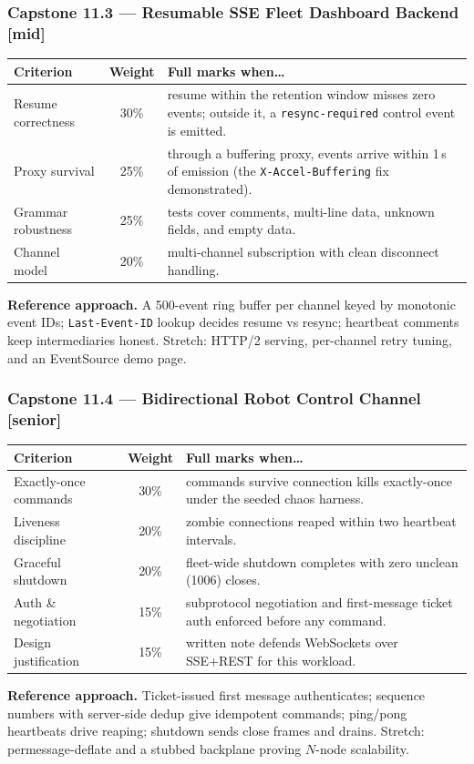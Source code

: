 \subsubsection*{Capstone 11.3 --- Resumable SSE Fleet Dashboard Backend [mid]}
\begin{center}\small
\begin{tabularx}{\textwidth}{l c X}
\toprule
\textbf{Criterion} & \textbf{Weight} & \textbf{Full marks when\ldots} \\
\midrule
Resume correctness & 30\% & resume within the retention window misses zero events; outside it, a \texttt{resync-required} control event is emitted. \\
Proxy survival & 25\% & through a buffering proxy, events arrive within 1\,s of emission (the \texttt{X-Accel-Buffering} fix demonstrated). \\
Grammar robustness & 25\% & tests cover comments, multi-line data, unknown fields, and empty data. \\
Channel model & 20\% & multi-channel subscription with clean disconnect handling. \\
\bottomrule
\end{tabularx}
\end{center}
\textbf{Reference approach.} A 500-event ring buffer per channel keyed by
monotonic event IDs; \texttt{Last-Event-ID} lookup decides resume vs
resync; heartbeat comments keep intermediaries honest. Stretch: HTTP/2
serving, per-channel retry tuning, and an EventSource demo page.

\subsubsection*{Capstone 11.4 --- Bidirectional Robot Control Channel [senior]}
\begin{center}\small
\begin{tabularx}{\textwidth}{l c X}
\toprule
\textbf{Criterion} & \textbf{Weight} & \textbf{Full marks when\ldots} \\
\midrule
Exactly-once commands & 30\% & commands survive connection kills exactly-once under the seeded chaos harness. \\
Liveness discipline & 20\% & zombie connections reaped within two heartbeat intervals. \\
Graceful shutdown & 20\% & fleet-wide shutdown completes with zero unclean (1006) closes. \\
Auth \& negotiation & 15\% & subprotocol negotiation and first-message ticket auth enforced before any command. \\
Design justification & 15\% & written note defends WebSockets over SSE+REST for this workload. \\
\bottomrule
\end{tabularx}
\end{center}
\textbf{Reference approach.} Ticket-issued first message authenticates;
sequence numbers with server-side dedup give idempotent commands; ping/pong
heartbeats drive reaping; shutdown sends close frames and drains. Stretch:
permessage-deflate and a stubbed backplane proving $N$-node scalability.

